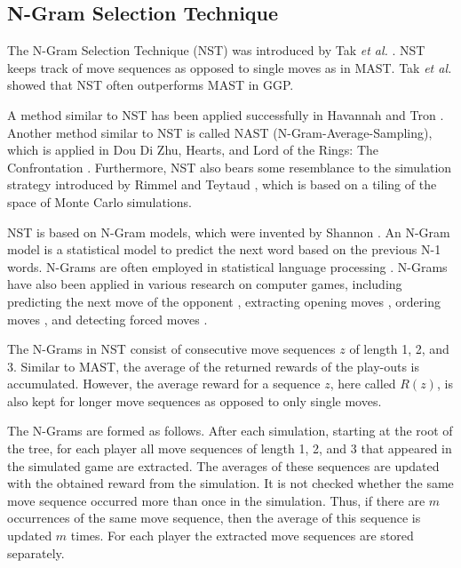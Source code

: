 \documentclass[journal]{IEEEtran}
\begin{document}
\subsection{N-Gram Selection Technique}
\label{subsec:ngramselection}
The N-Gram Selection Technique (NST) was introduced by Tak \emph{et al.} \cite{ngramArticle}. NST keeps track of move sequences as opposed to single moves as in MAST. Tak \emph{et al.} \cite{ngramArticle} showed that  NST often outperforms MAST in GGP.


A method similar to NST has been applied successfully in Havannah \cite{havannahThesis,stankiewicz2011} and Tron \cite{thesisTron}. Another method similar to NST is called NAST (N-Gram-Average-Sampling), which is applied in Dou Di Zhu, Hearts, and Lord of the Rings: The Confrontation \cite{nast}. Furthermore, NST also bears some resemblance to the simulation strategy introduced by Rimmel and Teytaud \cite{rimmel2010multiple}, which is based on a tiling of the space of Monte Carlo simulations.


NST is based on N-Gram models, which were invented by Shannon \cite{shanon}. An N-Gram model is a statistical model to predict the next word based on the previous N-1 words. N-Grams are often employed in statistical language processing \cite{languagebook}. N-Grams have also been applied in various research on computer games, including predicting the next move of the opponent \cite{gameswisdom,gamesbook},  extracting opening moves \cite{ngramOpening},  ordering moves \cite{bigram,ngramthesis}, and detecting forced moves  \cite{ngramForcedMove}.

The N-Grams in NST consist of consecutive move sequences $z$
of length 1, 2, and 3. Similar to MAST, the average of the returned rewards of the play-outs is accumulated. However, the average reward for a sequence $z$, here called $R(z)$, is also kept for longer move sequences as opposed to only single moves.

The N-Grams are formed as follows. After each simulation, starting at the root of the tree, for each player all move sequences of length 1, 2, and 3 that appeared in the simulated game are extracted. The averages of these sequences are updated with the obtained reward from the simulation. It is not checked whether the same move sequence occurred more than once in the simulation. Thus, if there are $m$ occurrences of the same move sequence, then the average of this sequence is updated $m$ times. For each player the extracted move sequences are stored separately. 
\end{document}
